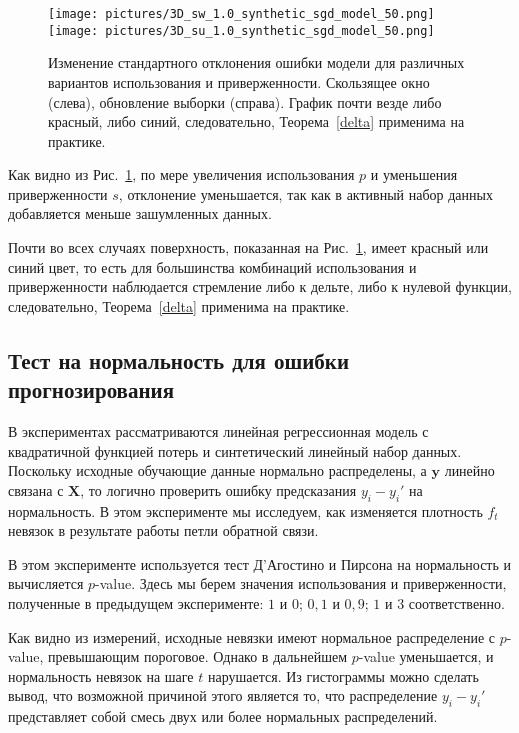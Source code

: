     \begin{figure}[h!]
        \centering
        \texttt{[image: pictures/3D\_sw\_1.0\_synthetic\_sgd\_model\_50.png]}
        \texttt{[image: pictures/3D\_su\_1.0\_synthetic\_sgd\_model\_50.png]}
        
        \caption{Изменение стандартного отклонения ошибки модели для различных вариантов использования и приверженности. Скользящее окно (слева), обновление выборки (справа). График почти везде либо красный, либо синий, следовательно, Теорема~\ref{delta} применима на практике.}
        \label{3D}
    \end{figure}

    Как видно из Рис.~\ref{3D}, по мере увеличения использования $p$ и уменьшения приверженности $s$, отклонение уменьшается, так как в активный набор данных добавляется меньше зашумленных данных.

    Почти во всех случаях поверхность, показанная на Рис.~\ref{3D}, имеет красный или синий цвет, то есть для большинства комбинаций использования и приверженности наблюдается стремление либо к дельте, либо к нулевой функции, следовательно, Теорема~\ref{delta} применима на практике.

\subsection{Тест на нормальность для ошибки прогнозирования} \label{exp_2}

    В экспериментах рассматриваются линейная регрессионная модель с квадратичной функцией потерь и синтетический линейный набор данных. Поскольку исходные обучающие данные нормально распределены, а $\mathbf{y}$ линейно связана с $\textbf{X}$, то логично проверить ошибку предсказания $y_i - y_i'$ на нормальность. В этом эксперименте мы исследуем, как изменяется плотность $f_t$ невязок в результате работы петли обратной связи.
        
    В этом эксперименте используется тест Д'Агостино и Пирсона на нормальность и вычисляется $p$-value. Здесь мы берем значения использования и приверженности, полученные в предыдущем эксперименте: $1$ и $0$; $0,1$ и $0,9$; $1$ и $3$ соответственно. 

    Как видно из измерений, исходные невязки имеют нормальное распределение с $p$-value, превышающим пороговое. Однако в дальнейшем $p$-value уменьшается, и нормальность невязок на шаге $t$ нарушается. 
    Из гистограммы можно сделать вывод, что возможной причиной этого является то, что распределение $y_i - y_i'$ представляет собой смесь двух или более нормальных распределений. 

